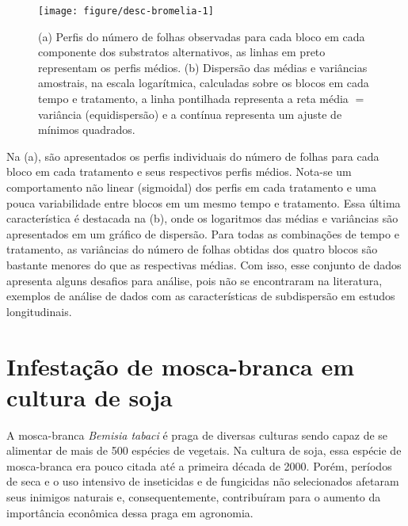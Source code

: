 \documentclass[
    oldfontcommands,
    11pt,
    openright,
    twoside,
    a4paper,
    english,
    brazil
]{abntex2}\usepackage[]{graphicx}\usepackage[]{color}
\newenvironment{knitrout}{}{} %
\begin{document}
\begin{knitrout}
\color{fgcolor}\begin{figure}[!htb]

{\centering \texttt{[image: figure/desc-bromelia-1]} 

}

\caption[(a) Perfis do número de folhas observadas para cada bloco em cada componente dos substratos alternativos, as linhas em preto representam os perfis médios]{(a) Perfis do número de folhas observadas para cada bloco em cada componente dos substratos alternativos, as linhas em preto representam os perfis médios. (b) Dispersão das médias e variâncias amostrais, na escala logarítmica, calculadas sobre os blocos em cada tempo e tratamento, a linha pontilhada representa a reta média $=$ variância (equidispersão) e a contínua representa um ajuste de mínimos quadrados.}\label{fig:desc-bromelia}
\end{figure}


\end{knitrout}

Na (a), são apresentados os perfis
individuais do número de folhas para cada bloco em cada tratamento e
seus respectivos perfis médios. Nota-se um comportamento não linear
(sigmoidal) dos perfis em cada tratamento e uma pouca variabilidade
entre blocos em um mesmo tempo e tratamento. Essa última característica
é destacada na (b), onde os logaritmos das
médias e variâncias são apresentados em um gráfico de dispersão. Para
todas as combinações de tempo e tratamento, as variâncias do número de
folhas obtidas dos quatro blocos são bastante menores do que as
respectivas médias. Com isso, esse conjunto de dados apresenta alguns
desafios para análise, pois não se encontraram na literatura, exemplos
de análise de dados com as características de subdispersão em estudos
longitudinais.

\section{Infestação de mosca-branca em cultura de soja}

A mosca-branca \textit{Bemisia tabaci} é praga de diversas culturas
sendo capaz de se alimentar de mais de 500 espécies de vegetais. Na
cultura de soja, essa espécie de mosca-branca era pouco citada até a
primeira década de 2000. Porém, períodos de seca e o uso intensivo de
inseticidas e de fungicidas não selecionados afetaram seus inimigos
naturais e, consequentemente, contribuíram para o aumento da importância
econômica dessa praga em agronomia.
\end{document}
